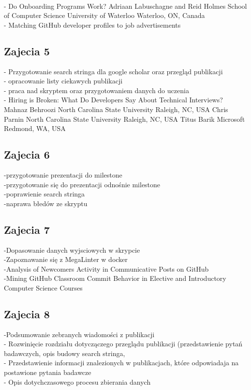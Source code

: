 \documentclass[graybox]{svmult}
\begin{document}
\\ - Do Onboarding Programs Work?
Adriaan Labuschagne and Reid Holmes
School of Computer Science
University of Waterloo
Waterloo, ON, Canada
\\ - Matching GitHub developer profiles to job
advertisements

\subsection{Zajecia 5}
- Przygotowanie search stringa dla google scholar oraz przegląd publikacji
\\ - opracowanie listy ciekawych publikacji
\\ - praca nad skryptem oraz przygotowaniem danych do uczenia
\\ - Hiring is Broken: What Do Developers Say About Technical Interviews? 
Mahnaz Behroozi North Carolina State University Raleigh, NC, USA
Chris Parnin North Carolina State University Raleigh, NC, USA
Titus Barik Microsoft Redmond, WA, USA

\subsection{Zajecia 6}
-przygotowanie prezentacji do milestone
\\-przygotowanie się do prezentacji odnośnie milestone
\\-poprawienie search stringa
\\-naprawa błedów ze skryptu

\subsection{Zajecia 7}
-Dopasowanie danych wyjsciowych w skrypcie
\\-Zapoznawanie się z MegaLinter w docker
\\-Analysis of Newcomers Activity in Communicative Posts on GitHub
\\-Mining GitHub Classroom Commit Behavior in Elective and Introductory Computer Science Courses

\subsection{Zajecia 8}
-Podsumowanie zebranych wiadomości z publikacji
\\- Rozwinięcie rozdziału dotyczączego przeglądu publikacji (przedstawienie pytań badawczych, opis budowy search stringa,
\\- Przedstawienie informacji znalezionych w publikacjach, które odpowiadaja na postawione pytania badawcze
\\ - Opis dotychczasowego procesu zbierania danych
\end{document}
